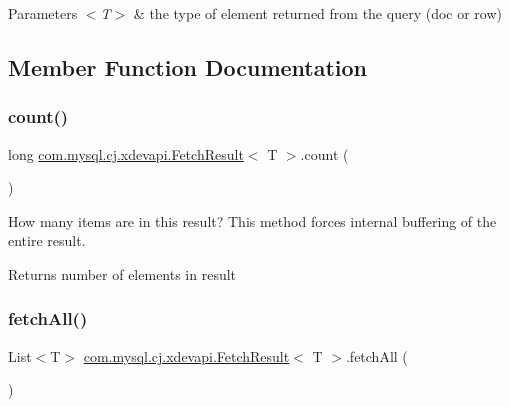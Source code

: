 \begin{DoxyParams}{Parameters}
{\em $<$\+T$>$} & the type of element returned from the query (doc or row) \\
\hline
\end{DoxyParams}


\subsection{Member Function Documentation}
\mbox{\label{interfacecom_1_1mysql_1_1cj_1_1xdevapi_1_1_fetch_result_acd63b4c5515ea1932ea1333544deb5b4}} 
\subsubsection{\texorpdfstring{count()}{count()}}
{\footnotesize\ttfamily long \mbox{\hyperlink{interfacecom_1_1mysql_1_1cj_1_1xdevapi_1_1_fetch_result}{com.\+mysql.\+cj.\+xdevapi.\+Fetch\+Result}}$<$ T $>$.count (\begin{DoxyParamCaption}{ }\end{DoxyParamCaption})}

How many items are in this result? This method forces internal buffering of the entire result.

\begin{DoxyReturn}{Returns}
number of elements in result 
\end{DoxyReturn}
\mbox{\label{interfacecom_1_1mysql_1_1cj_1_1xdevapi_1_1_fetch_result_ac6b0c7cf034f9137539e36bf4a2efb57}} 
\subsubsection{\texorpdfstring{fetch\+All()}{fetchAll()}}
{\footnotesize\ttfamily List$<$T$>$ \mbox{\hyperlink{interfacecom_1_1mysql_1_1cj_1_1xdevapi_1_1_fetch_result}{com.\+mysql.\+cj.\+xdevapi.\+Fetch\+Result}}$<$ T $>$.fetch\+All (\begin{DoxyParamCaption}{ }\end{DoxyParamCaption})}

